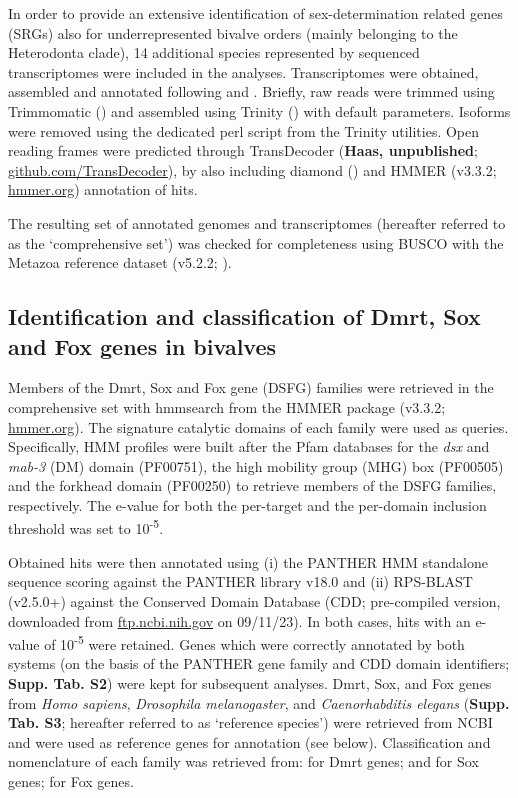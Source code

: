 \documentclass[../main.tex]{subfiles}
\begin{document}
In order to provide an extensive identification of sex-determination related genes (SRGs) also for underrepresented bivalve orders (mainly belonging to the Heterodonta clade), 14 additional species represented by sequenced transcriptomes were included in the analyses. Transcriptomes were obtained, assembled and annotated following \textbf{\cite{piccinini2021mitonuclear}} and \textbf{\cite{iannello2023signatures}}. Briefly, raw reads were trimmed using Trimmomatic (\textbf{\cite{bolger2014trimmomatic}}) and assembled using Trinity (\textbf{\cite{grabherr2011trinity}}) with default parameters. Isoforms were removed using the dedicated perl script from the Trinity utilities. Open reading frames were predicted through TransDecoder (\textbf{Haas, unpublished}; \href{https://github.com/TransDecoder/TransDecoder}{github.com/TransDecoder}), by also including diamond (\textbf{\cite{buchfink2015fast}}) and HMMER (v3.3.2; \href{http://hmmer.org/}{hmmer.org}) annotation of hits.

The resulting set of annotated genomes and transcriptomes (hereafter referred to as the ‘comprehensive set’) was checked for completeness using BUSCO with the Metazoa reference dataset (v5.2.2; \textbf{\cite{manni2021busco}}).

\subsection{Identification and classification of Dmrt, Sox and Fox genes in bivalves}
Members of the Dmrt, Sox and Fox gene (DSFG) families were retrieved in the comprehensive set with hmmsearch from the HMMER package (v3.3.2; \href{http://hmmer.org/}{hmmer.org}). The signature catalytic domains of each family were used as queries. Specifically, HMM profiles were built after the Pfam databases for the \textit{dsx} and \textit{mab-3} (DM) domain (PF00751), the high mobility group (MHG) box (PF00505) and the forkhead domain (PF00250) to retrieve members of the DSFG families, respectively. The e-value for both the per-target and the per-domain inclusion threshold was set to 10\textsuperscript{-5}.

Obtained hits were then annotated using (i) the PANTHER HMM standalone sequence scoring against the PANTHER library v18.0 and (ii) RPS-BLAST (v2.5.0+) against the Conserved Domain Database (CDD; pre-compiled version, downloaded from \href{https://ftp.ncbi.nih.gov/pub/mmdb/cdd/little\_endian/}{ftp.ncbi.nih.gov} on 09/11/23). In both cases, hits with an e-value of 10\textsuperscript{-5} were retained. Genes which were correctly annotated by both systems (on the basis of the PANTHER gene family and CDD domain identifiers; \textbf{Supp. Tab. S2}) were kept for subsequent analyses. Dmrt, Sox, and Fox genes from \textit{Homo sapiens}, \textit{Drosophila melanogaster}, and \textit{Caenorhabditis elegans} (\textbf{Supp. Tab. S3}; hereafter referred to as ‘reference species’) were retrieved from NCBI and were used as reference genes for annotation (see below). Classification and nomenclature of each family was retrieved from: \textbf{\cite{mawaribuchi2019independent}} for Dmrt genes; \textbf{\cite{phochanukul2010no}} and \textbf{\cite{sarkar2013sox}} for Sox genes; \textbf{\cite{mazet2003phylogenetic}} for Fox genes.
\end{document}
